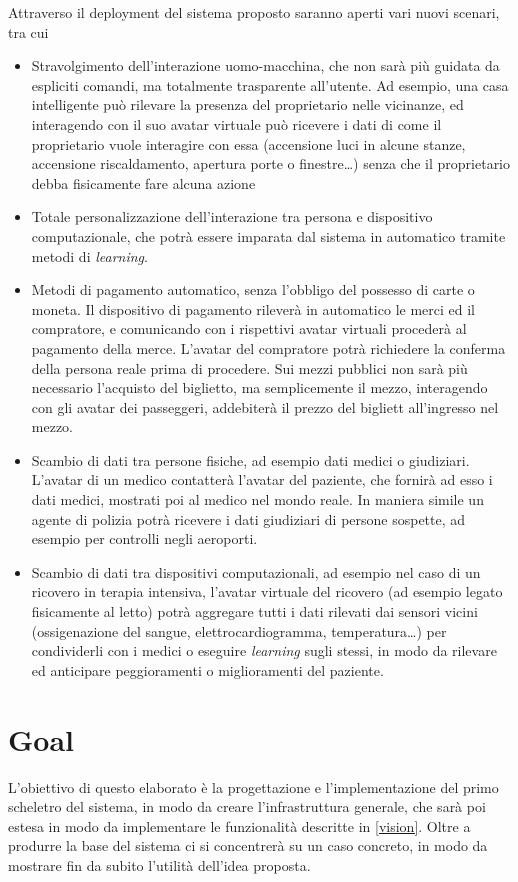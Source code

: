 \documentclass[a4paper,12pt]{report}
\begin{document}
Attraverso il deployment del sistema proposto saranno aperti vari nuovi scenari, tra cui
\begin{itemize}
	\item  Stravolgimento dell'interazione uomo-macchina, che non sarà più guidata da espliciti comandi, ma totalmente trasparente all'utente. Ad esempio, una casa intelligente può rilevare la presenza del proprietario nelle vicinanze, ed interagendo con il suo avatar virtuale può ricevere i dati di come il proprietario vuole interagire con essa (accensione luci in alcune stanze, accensione riscaldamento, apertura porte o finestre\dots) senza che il proprietario debba fisicamente fare alcuna azione
	\item Totale personalizzazione dell'interazione tra persona e dispositivo computazionale, che potrà essere imparata dal sistema in automatico tramite metodi di \emph{learning}.
	\item Metodi di pagamento automatico, senza l'obbligo del possesso di carte o moneta. Il dispositivo di pagamento rileverà in automatico le merci ed il compratore, e comunicando con i rispettivi avatar virtuali procederà al pagamento della merce. L'avatar del compratore potrà richiedere la conferma della persona reale prima di procedere. Sui mezzi pubblici non sarà più necessario l'acquisto del biglietto, ma semplicemente il mezzo, interagendo con gli avatar dei passeggeri, addebiterà il prezzo del bigliett all'ingresso nel mezzo.
	\item Scambio di dati tra persone fisiche, ad esempio dati medici o giudiziari. L'avatar di un medico contatterà l'avatar del paziente, che fornirà ad esso i dati medici, mostrati poi al medico nel mondo reale. In maniera simile un agente di polizia potrà ricevere i dati giudiziari di persone sospette, ad esempio per controlli negli aeroporti. 
	\item Scambio di dati tra dispositivi computazionali, ad esempio nel caso di un ricovero in terapia intensiva, l'avatar virtuale del ricovero (ad esempio legato fisicamente al letto) potrà aggregare tutti i dati rilevati dai sensori vicini (ossigenazione del sangue, elettrocardiogramma, temperatura\dots) per condividerli con i medici o eseguire \emph{learning} sugli stessi, in modo da rilevare ed anticipare peggioramenti o miglioramenti del paziente.
\end{itemize}

\section{Goal} \label{goal}
L'obiettivo di questo elaborato è la progettazione e l'implementazione del primo scheletro del sistema, in modo da creare l'infrastruttura generale, che sarà poi estesa in modo da implementare le funzionalità descritte in \autoref{vision}. Oltre a produrre la base del sistema ci si concentrerà su un caso concreto, in modo da mostrare fin da subito l'utilità dell'idea proposta. 
\end{document}
